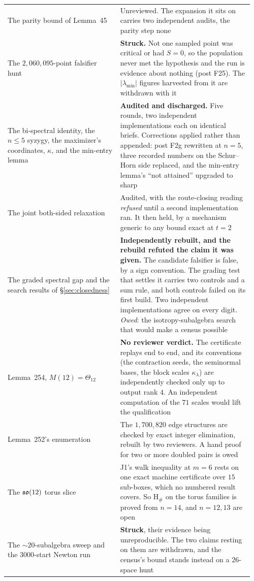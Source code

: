 \begin{longtable}{@{}p{0.44\linewidth}p{0.52\linewidth}@{}}
The parity bound of Lemma~45 & Unreviewed. The expansion it sits on carries two independent audits, the parity step none \\
The $2{,}060{,}095$-point falsifier hunt & \textbf{Struck.} Not one sampled point was critical or had $S=0$, so the population never met the hypothesis and the run is evidence about nothing (post F25). The $|\lambda_{\min}|$ figures harvested from it are withdrawn with it \\
The bi-spectral identity, the $n\le5$ syzygy, the maximizer's coordinates, $\kappa$, and the min-entry lemma & \textbf{Audited and discharged.} Five rounds, two independent implementations each on identical briefs. Corrections applied rather than appended: post F2g rewritten at $n=5$, three recorded numbers on the Schur--Horn side replaced, and the min-entry lemma's ``not attained'' upgraded to sharp \\
The joint both-sided relaxation & Audited, with the route-closing reading \emph{refused} until a second implementation ran. It then held, by a mechanism generic to any bound exact at $t=2$ \\
The graded spectral gap and the search results of \S\ref{sec:closedness} & \textbf{Independently rebuilt, and the rebuild refuted the claim it was given.} The candidate falsifier is false, by a sign convention. The grading test that settles it carries two controls and a sum rule, and both controls failed on its first build. Two independent implementations agree on every digit. \emph{Owed}: the isotropy-subalgebra search that would make a census possible \\
Lemma~254, $M(12)=\Theta_{12}$ & \textbf{No reviewer verdict.} The certificate replays end to end, and its conventions (the contraction seeds, the seminormal bases, the block scales $\kappa_\lambda$) are independently checked only up to output rank $4$. An independent computation of the $71$ scales would lift the qualification \\
Lemma~252's enumeration & The $1{,}700{,}820$ edge structures are checked by exact integer elimination, rebuilt by two reviewers. A hand proof for two or more doubled pairs is owed \\
The $\mathfrak{so}(12)$ torus slice & J1's walk inequality at $m=6$ rests on one exact machine certificate over $15$ sub-boxes, which no numbered result covers. So H$_\#$ on the torus families is proved from $n=14$, and $n=12,13$ are open \\
The $\sim20$-subalgebra sweep and the $3000$-start Newton run & \textbf{Struck}, their evidence being unreproducible. The two claims resting on them are withdrawn, and the census's bound stands instead on a $26$-space hunt \\
\bottomrule
\end{longtable}

